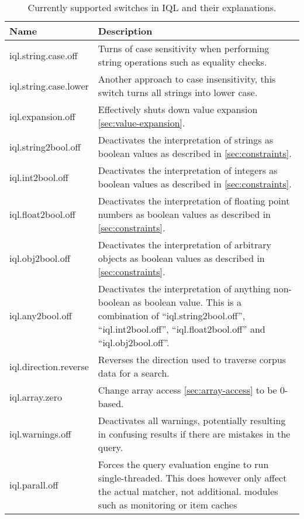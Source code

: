\documentclass[11pt]{article}
\begin{document}
\begin{table}
\label{tab:switches}
\noindent\begin{tabular}{|p{}|p{}|}
\hline 
Name	& Description \\ 
\hline 
\hline
iql.string.case.off         & Turns of case sensitivity when performing string operations such as equality checks.  \\ 
\hline
iql.string.case.lower       & Another approach to case insensitivity, this switch turns all strings into lower case.  \\ 
\hline
iql.expansion.off           & Effectively shuts down value expansion \cref{sec:value-expansion}.  \\ 
\hline
iql.string2bool.off         & Deactivates the interpretation of strings as boolean values as described in \cref{sec:constraints}.  \\ 
\hline
iql.int2bool.off            & Deactivates the interpretation of integers as boolean values as described in \cref{sec:constraints}.  \\ 
\hline
iql.float2bool.off          & Deactivates the interpretation of floating point numbers as boolean values as described in \cref{sec:constraints}.  \\ 
\hline
iql.obj2bool.off            & Deactivates the interpretation of arbitrary objects as boolean values as described in \cref{sec:constraints}.  \\ 
\hline
iql.any2bool.off            & Deactivates the interpretation of anything non-boolean as boolean value. This is a combination of ``iql.string2bool.off'', ``iql.int2bool.off'', ``iql.float2bool.off'' and  ``iql.obj2bool.off''.  \\ 
\hline
iql.direction.reverse       & Reverses the direction used to traverse corpus data for a search.  \\ 
\hline
iql.array.zero              & Change array access \cref{sec:array-access} to be 0-based.  \\ 
\hline
iql.warnings.off            & Deactivates all warnings, potentially resulting in confusing results if there are mistakes in the query.  \\ 
\hline
iql.parall.off			  & Forces the query evaluation engine to run single-threaded. This does however only affect the actual matcher, not additional. modules such as monitoring or item caches  \\ 
\hline
\end{tabular}
\caption{Currently supported switches in IQL and their explanations.}
\end{table}
\end{document}
